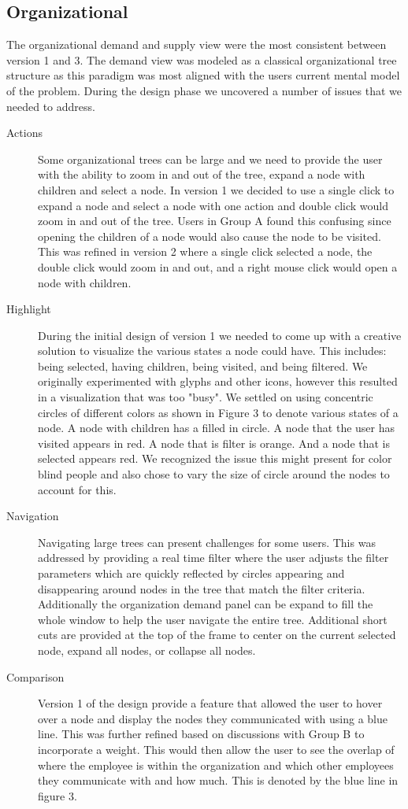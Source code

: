 \message{ !name(FinalPaper.tex)}\documentclass[journal]{vgtc}                %
\begin{document}
\subsection{Organizational}
The organizational demand and supply view were the most consistent between version 1 and 3.  The demand view was modeled as a classical organizational tree structure as this paradigm was most aligned with the users current mental model of the problem.  During the design phase we uncovered a number of issues that we needed to address.
\begin{description}
	\item[Actions] Some organizational trees can be large and we need to provide the user with the ability to zoom in and out of the tree, expand a node with children and select a node.  In version 1 we decided to use a single click to expand a node and select a node with one action and double click would zoom in and out of the tree.  Users in Group A found this confusing since opening the children of a node would also cause the node to be visited.  This was refined in version 2 where a single click selected a node, the double click would zoom in and out, and a right mouse click would open a node with children.  
	\item [Highlight] During the initial design of version 1 we needed to come up with a creative solution to visualize the various states a node could have.  This includes: being selected, having children, being visited, and being filtered.  We originally experimented with glyphs and other icons, however this resulted in a visualization that was too "busy".  We settled on using concentric circles of different colors as shown in Figure 3 to denote various states of a node.  A node with children has a filled in circle.  A node that the user has visited appears in red.  A node that is filter is orange. And a node that is selected appears red.  We recognized the issue this might present for color blind people and also chose to vary the size of circle around the nodes to account for this.
	\item [Navigation] Navigating large trees can present challenges for some users.  This was addressed by providing a real time filter where the user adjusts the filter parameters which are quickly reflected by circles appearing and disappearing around nodes in the tree that match the filter criteria.  Additionally the organization demand panel can be expand to fill the whole window to help the user navigate the entire tree.  Additional short cuts are provided at the top of the frame to center on the current selected node, expand all nodes, or collapse all nodes.
	\item [Comparison] Version 1 of the design provide a feature that allowed the user to hover over a node and display the nodes they communicated with using a blue line.  This was further refined based on discussions with Group B to incorporate a weight.  This would then allow the user to see the overlap of where the employee is within the organization and which other employees they communicate with and how much.  This is denoted by the blue line in figure 3.
\end{description}
\end{document}
